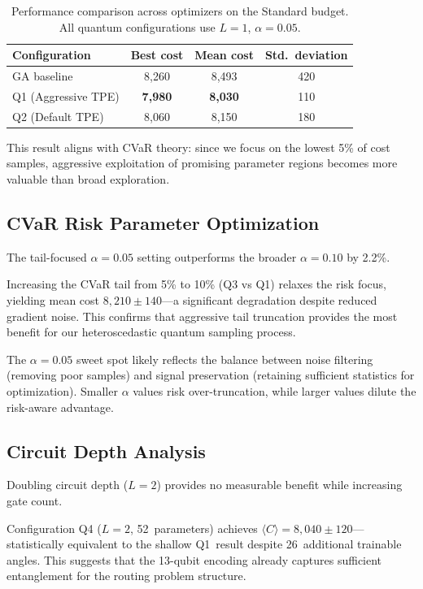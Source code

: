 \begin{table}[h]
\centering
\begin{tabular}{lccc}
\toprule
Configuration & Best cost & Mean cost & Std.\ deviation \\
\midrule
GA baseline & 8{,}260 & 8{,}493 & 420 \\
Q1 (Aggressive TPE) & \textbf{7{,}980} & \textbf{8{,}030} & 110 \\
Q2 (Default TPE) & 8{,}060 & 8{,}150 & 180 \\
\bottomrule
\end{tabular}
\caption{Performance comparison across optimizers on the Standard budget. 
         All quantum configurations use $L=1$, $\alpha=0.05$.}
\label{tab:optimisers}
\end{table}

This result aligns with CVaR theory: since we focus on the lowest 5\% of cost 
samples, aggressive exploitation of promising parameter regions becomes more 
valuable than broad exploration.

\subsection{CVaR Risk Parameter Optimization}

The tail-focused $\alpha=0.05$ setting outperforms the broader $\alpha=0.10$ 
by 2.2\%.

Increasing the CVaR tail from 5\% to 10\% (Q3 vs Q1) relaxes the risk focus, 
yielding mean cost $8{,}210\pm140$—a significant degradation despite reduced 
gradient noise. This confirms that aggressive tail truncation provides the 
most benefit for our heteroscedastic quantum sampling process.

The $\alpha=0.05$ sweet spot likely reflects the balance between noise filtering 
(removing poor samples) and signal preservation (retaining sufficient statistics 
for optimization). Smaller $\alpha$ values risk over-truncation, while larger 
values dilute the risk-aware advantage.

\subsection{Circuit Depth Analysis}

Doubling circuit depth ($L=2$) provides no measurable benefit while increasing 
gate count.

Configuration Q4 ($L=2$, 52~parameters) achieves $\langle C\rangle=8{,}040\pm120$—statistically 
equivalent to the shallow Q1~result despite 26~additional trainable angles. 
This suggests that the 13-qubit encoding already captures sufficient entanglement 
for the routing problem structure.


